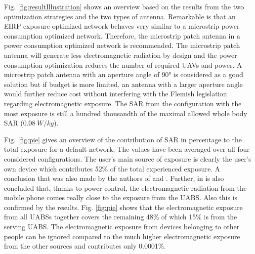 \documentclass[twocolumn]{phdsymp} %
\begin{document}
Fig. \ref{fig:resultIllustration} shows an overview based on the results from the two optimization strategies and the two types of antenna.
Remarkable is that an \gls{EIRP} exposure optimized network behaves very similar to a microstrip power consumption optimized network.
Therefore, the microstrip patch antenna in a power consumption optimized network is recommended. 
The microstrip patch antenna will generate less electromagnetic radiation by design and
the power consumption optimization reduces the number of required \gls{UAV}s and power. A microstrip patch antenna with an aperture 
angle of \ang{90} is considered as a good solution but if budget is more limited, an antenna with a larger aperture angle 
would further reduce cost without interfering with the Flemish legislation regarding electromagnetic exposure.
The \gls{SAR} from the configuration with the most exposure is still a hundred thousandth of the maximal allowed whole body \gls{SAR}  ($0.08\ W/kg$).


Fig. \ref{fig:pie} gives
an overview of the contribution of \gls{SAR} in percentage to the total 
exposure for a default network. The values have been averaged over all four considered configurations. 
The user's main source of exposure is clearly the user's own device which contributes 52\% of the total experienced exposure.
A conclusion that was also made by the authors of \cite{J17_kuehn2019modelling} and  \cite{J10.1.1}.
Further, in \cite{J10.1.1} is also concluded that,
thanks to power control, the electromagnetic radiation from the mobile phone 
comes really close to the exposure from the \gls{UABS}. 
Also this is confirmed by the results. Fig. \ref{fig:pie} shows that the electromagnetic exposure 
from all \gls{UABS}s together covers the remaining 48\% of which 15\% is from the serving UABS. 
The electromagnetic
 exposure from devices belonging to other people can be ignored compared to the much higher electromagnetic exposure from the other sources
 and contributes only 0.0001\%.

\end{document}
